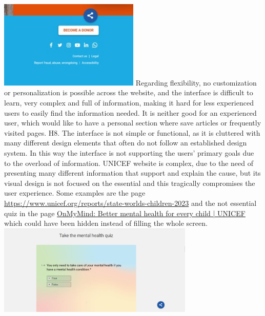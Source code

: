 \newline \includegraphics[width=0.5\textwidth]{FinalScores13.jpg}
\newline Regarding flexibility, no customization or personalization is possible across the website, and the interface is difficult to learn, very complex and full of information, making it hard for less experienced users to easily find the information needed. It is neither good for an experienced user, which would like to have a personal section where save articles or frequently visited pages.
\newline
\newline H8.	The interface is not simple or functional, as it is cluttered with many different design elements that often do not follow an established design system. In this way the interface is not supporting the users’ primary goals due to the overload of information.
\newline UNICEF website is complex, due to the need of presenting many different information that support and explain the cause, but its visual design is not focused on the essential and this tragically compromises the user experience.
\newline Some examples are the page \href{https://www.unicef.org/reports/state-worlds-children-2023}{https://www.unicef.org/reports/state-worlds-children-2023} and the not essential quiz in the page \href{https://www.unicef.org/on-my-mind}{OnMyMind: Better mental health for every child | UNICEF} which could have been hidden instead of filling the whole screen. 
\newline \includegraphics[width=0.7\textwidth]{FinalScores14.jpg}
\newline
